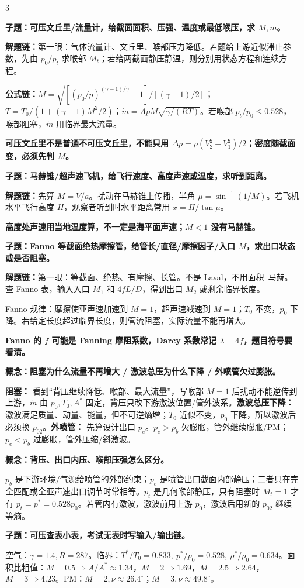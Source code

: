 \documentclass[a4paper]{article}
\newcommand{\qt}[1]{\vspace{0.10pt}\colorbox{Q}{\parbox{\dimexpr\linewidth-2\fboxsep}{\color{white}\bfseries #1}}\par}
\newcommand{\ans}[1]{\colorbox{G}{\parbox{\dimexpr\linewidth-2\fboxsep}{#1}}\par}
\newcommand{\warn}[1]{\colorbox{Y}{\parbox{\dimexpr\linewidth-2\fboxsep}{\color{E}\bfseries #1}}\par}
\newcommand{\chain}[1]{{\color{A}\bfseries 解题链：}#1\par}
\newcommand{\form}[1]{{\color{M}\bfseries 公式链：}#1\par}
\begin{document}
\begin{multicols}{3}
\qt{子题：可压文丘里/流量计，给截面面积、压强、温度或最低喉压，求 $M,\dot m$。}
\chain{第一眼：气体流量计、文丘里、喉部压力降低。若题给上游近似滞止参数，先由 $p_0/p_t$ 求喉部 $M_t$；若给两截面静压静温，则分别用状态方程和连续方程。}
\form{$M=\sqrt{[(p_0/p)^{(\gamma-1)/\gamma}-1]/[(\gamma-1)/2]}$；$T=T_0/(1+(\gamma-1)M^2/2)$；$\dot m=ApM\sqrt{\gamma/(RT)}$。若喉部 $p_t/p_0\le0.528$，喉部阻塞，$\dot m$ 用临界最大流量。}
\warn{可压文丘里不是普通不可压文丘里，不能只用 $\Delta p=\rho(V_2^2-V_1^2)/2$；密度随截面变，必须先判 $M$。}

\qt{子题：马赫锥/超声速飞机，给飞行速度、高度声速或温度，求听到距离。}
\chain{先算 $M=V/a$。扰动在马赫锥上传播，半角 $\mu=\sin^{-1}(1/M)$。若飞机水平飞行高度 $H$，观察者听到时水平距离常用 $x=H/\tan\mu$。}
\warn{高度处声速用当地温度算，不一定是海平面声速；$M<1$ 没有马赫锥。}

\qt{子题：Fanno 等截面绝热摩擦管，给管长/直径/摩擦因子/入口 $M$，求出口状态或是否阻塞。}
\chain{第一眼：等截面、绝热、有摩擦、长管。不是 Laval，不用面积--马赫。查 Fanno 表，输入入口 $M_1$ 和 $4fL/D$，得到出口 $M_2$ 或剩余临界长度。}
\ans{Fanno 规律：摩擦使亚声速加速到 $M=1$，超声速减速到 $M=1$；$T_0$ 不变，$p_0$ 下降。若给定长度超过临界长度，则管流阻塞，实际流量不能再增大。}
\warn{Fanno 的 $f$ 可能是 Fanning 摩阻系数，Darcy 系数常记 $\lambda=4f$，题目符号要看清。}

\qt{概念：阻塞为什么流量不再增大 / 激波总压为什么下降 / 外喷管欠过膨胀。}
\ans{\textbf{阻塞：} 看到“背压继续降低、喉部、最大流量”，写喉部 $M=1$ 后扰动不能逆传到上游，$\dot m$ 由 $p_0,T_0,A^*$ 固定，背压只改下游激波位置/管外波系。\textbf{激波总压下降：} 激波满足质量、动量、能量，但不可逆熵增；$T_0$ 近似不变，$p_0$ 下降，所以激波后必须换 $p_{02}$。\textbf{外喷管：} 先算设计出口 $p_e$。$p_e>p_b$ 欠膨胀，管外继续膨胀/PM；$p_e<p_b$ 过膨胀，管外压缩/斜激波。}
\qt{概念：背压、出口内压、喉部压强怎么区分。}
\ans{$p_b$ 是下游环境/气源给喷管的外部约束；$p_e$ 是喷管出口截面内部静压；二者只在完全匹配或全亚声速出口调节时常相等。$p_t$ 是几何喉部静压，只有阻塞时 $M_t=1$ 才有 $p_t=p^*=0.528p_0$。若管内有激波，激波前用上游 $p_0$，激波后用新的 $p_{02}$ 继续等熵。}

\qt{子题：可压查表小表，考试无表时写输入/输出链。}
\ans{空气：$\gamma=1.4,R=287$。临界：$T^*/T_0=0.833,\ p^*/p_0=0.528,\ \rho^*/\rho_0=0.634$。面积比粗值：$M=0.5\Rightarrow A/A^*\approx1.34$，$M=2\Rightarrow1.69$，$M=2.5\Rightarrow2.64$，$M=3\Rightarrow4.23$。PM：$M=2,\nu\approx26.4^\circ$；$M=3,\nu\approx49.8^\circ$。}



\end{multicols}
\end{document}
